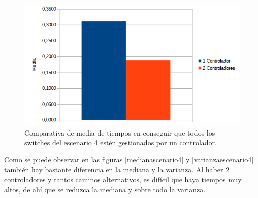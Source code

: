 \documentclass[a4paper, 12pt]{book}
\begin{document}
	\begin{figure}[H]
		\centering
		\includegraphics[width=13cm, keepaspectratio]{img/comparativamediaescenario4}
		\caption{Comparativa de media de tiempos en conseguir que todos los switches del escenario 4 estén gestionados por un controlador.}
		\label{figura:mediaescenario4}
	\end{figure}
	

	Como se puede observar en las figuras \ref{medianascenario4} y \ref{varianzaescenario4} también hay bastante diferencia en la mediana y la varianza. Al haber 2 controladores y tantos caminos alternativos, es difícil que haya tiempos muy altos, de ahí que se reduzca la mediana y sobre todo la varianza.
	
\end{document}
